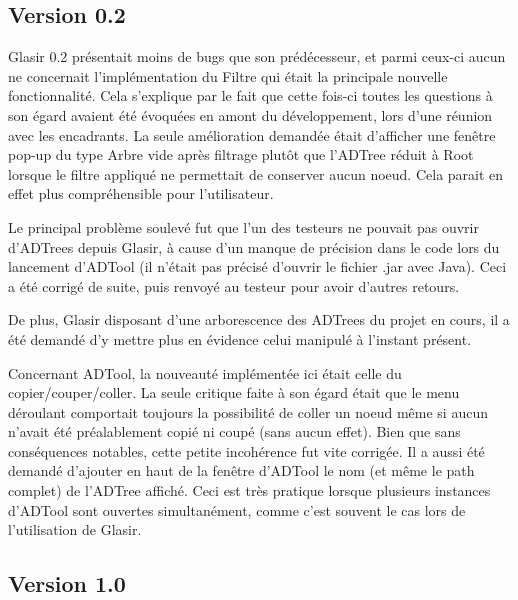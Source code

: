 \subsection{Version 0.2}
\label{subsec:v0.2}

Glasir 0.2 présentait moins de \og bugs \fg{} que son prédécesseur, et parmi ceux-ci aucun ne concernait l'implémentation du Filtre qui était la principale nouvelle fonctionnalité. Cela s'explique par le fait que cette fois-ci toutes les questions à son égard avaient été évoquées en amont du développement, lors d'une réunion avec les encadrants. La seule amélioration demandée était d'afficher une fenêtre pop-up du type \og Arbre vide après filtrage \fg{} plutôt que l'ADTree réduit à \og Root \fg{} lorsque le filtre appliqué ne permettait de conserver aucun noeud. Cela parait en effet plus compréhensible pour l'utilisateur.

Le principal problème soulevé fut que l'un des testeurs ne pouvait pas ouvrir d'ADTrees depuis Glasir, à cause d'un manque de précision dans le code lors du lancement d'ADTool (il n'était pas précisé d'ouvrir le fichier .jar avec Java). Ceci a été corrigé de suite, puis renvoyé au testeur pour avoir d'autres retours. 

De plus, Glasir disposant d'une arborescence des ADTrees du projet en cours, il a été demandé d'y mettre plus en évidence celui manipulé à l'instant présent.

Concernant ADTool, la nouveauté implémentée ici était celle du copier/couper/coller. La seule critique faite à son égard était que le menu déroulant comportait toujours la possibilité de coller un noeud même si aucun n'avait été préalablement copié ni coupé (sans aucun effet). Bien que sans conséquences notables, cette petite incohérence fut vite corrigée. Il a aussi été demandé d'ajouter en haut de la fenêtre d'ADTool le nom (et même le path complet) de l'ADTree affiché. Ceci est très pratique lorsque plusieurs instances d'ADTool sont ouvertes simultanément, comme c'est souvent le cas lors de l'utilisation de Glasir. 

\subsection{Version 1.0}
\label{subsec:v1.0}